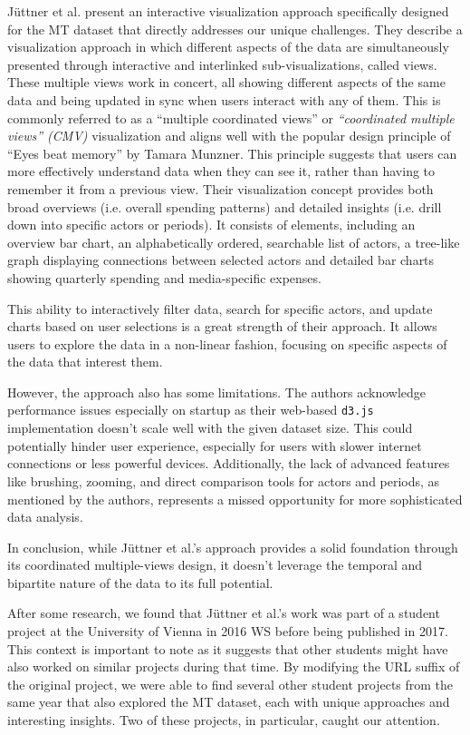 \documentclass{vgtc}
\begin{document}
Jüttner et al. \cite{Jttner2017MediaTI} present an interactive visualization approach specifically designed for the MT dataset that directly addresses our unique challenges.
They describe a visualization approach in which different aspects of the data are simultaneously presented through interactive and interlinked sub-visualizations, called views. These multiple views work in concert, all showing different aspects of the same data and being updated in sync when users interact with any of them. This is commonly referred to as a ``multiple coordinated views'' or \textit{``coordinated multiple views'' (CMV)} \cite{roberts2007state} visualization and aligns well with the popular design principle of ``Eyes beat memory'' by Tamara Munzner. This principle suggests that users can more effectively understand data when they can see it, rather than having to remember it from a previous view. Their visualization concept provides both broad overviews (i.e. overall spending patterns) and detailed insights (i.e. drill down into specific actors or periods). It consists of elements, including an overview bar chart, an alphabetically ordered, searchable list of actors, a tree-like graph displaying connections between selected actors and detailed bar charts showing quarterly spending and media-specific expenses.

This ability to interactively filter data, search for specific actors, and update charts based on user selections is a great strength of their approach. It allows users to explore the data in a non-linear fashion, focusing on specific aspects of the data that interest them.

However, the approach also has some limitations. The authors acknowledge performance issues especially on startup as their web-based \texttt{d3.js} implementation doesn't scale well with the given dataset size. This could potentially hinder user experience, especially for users with slower internet connections or less powerful devices. Additionally, the lack of advanced features like brushing, zooming, and direct comparison tools for actors and periods, as mentioned by the authors, represents a missed opportunity for more sophisticated data analysis.

In conclusion, while Jüttner et al.'s approach provides a solid foundation through its coordinated multiple-views design, it doesn't leverage the temporal and bipartite nature of the data to its full potential.

After some research, we found that Jüttner et al.'s work was part of a student project at the University of Vienna in 2016 WS \cite{univie10} before being published in 2017. This context is important to note as it suggests that other students might have also worked on similar projects during that time. By modifying the URL suffix of the original project, we were able to find several other student projects from the same year that also explored the MT dataset, each with unique approaches and interesting insights. Two of these projects, in particular, caught our attention.
\end{document}
